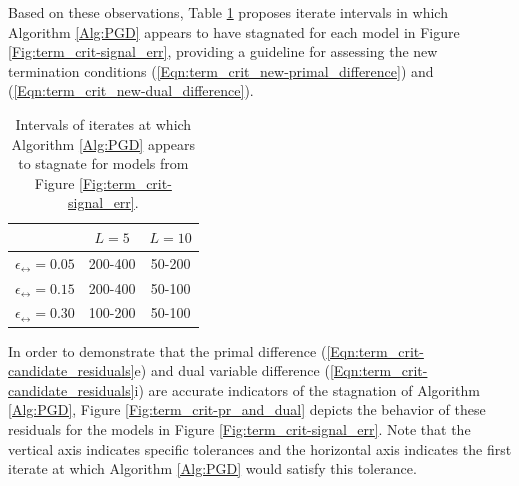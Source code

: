 Based on these observations, Table \ref{Tab:term_crit-desired_termination_windows} proposes iterate intervals in which Algorithm \ref{Alg:PGD} appears to have stagnated for each model in Figure \ref{Fig:term_crit-signal_err}, providing a guideline for assessing the new termination conditions (\ref{Eqn:term_crit_new-primal_difference}) and (\ref{Eqn:term_crit_new-dual_difference}).
\begin{table}[H]
\centering
\begin{tabular}{ |c|c|c| }
\hline
&	$L = 5$
	&	$L = 10$	\\
 \hline
$\epsilon_\rel = 0.05$
&     200-400 &   50-200 		\\
 \hline
$\epsilon_\rel = 0.15$
&  200-400 &  50-100 	\\
 \hline
$\epsilon_\rel = 0.30$
&  100-200 &  50-100	\\
 \hline
\end{tabular}
	\caption{Intervals of iterates at which Algorithm \ref{Alg:PGD} appears to stagnate for models from Figure \ref{Fig:term_crit-signal_err}.}
	\label{Tab:term_crit-desired_termination_windows}
\end{table}







In order to demonstrate that the primal difference (\ref{Eqn:term_crit-candidate_residuals}e) and dual variable difference (\ref{Eqn:term_crit-candidate_residuals}i) are accurate indicators of the stagnation of Algorithm \ref{Alg:PGD}, Figure \ref{Fig:term_crit-pr_and_dual} depicts the behavior of these residuals for the models in Figure \ref{Fig:term_crit-signal_err}.  
Note that the vertical axis indicates specific tolerances and the horizontal axis indicates the first iterate at which Algorithm \ref{Alg:PGD} would satisfy this tolerance.


